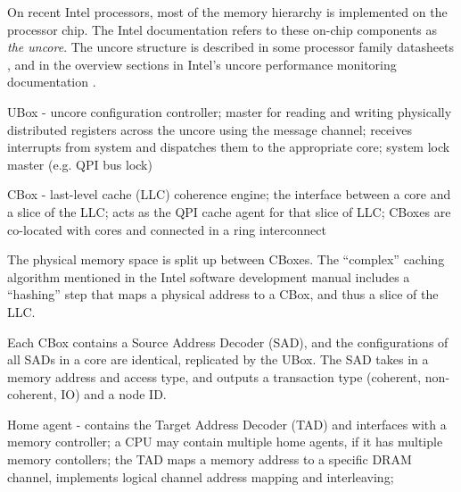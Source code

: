 On recent Intel processors, most of the memory hierarchy is implemented on the
processor chip. The Intel documentation refers to these on-chip components as
\textit{the uncore}. The uncore structure is described in some processor
family datasheets \cite{intel2014datasheet,intel2010datasheet}, and in the
overview sections in Intel's uncore performance monitoring documentation
\cite{intel2014uncore, intel2012uncore, intel2010uncore}.

UBox - uncore configuration controller; master for reading and writing
physically distributed registers across the uncore using the message
channel; receives interrupts from system and dispatches them to the
appropriate core; system lock master (e.g. QPI bus lock)

CBox - last-level cache (LLC) coherence engine; the interface between a core
and a slice of the LLC; acts as the QPI cache agent for that slice of LLC;
CBoxes are co-located with cores and connected in a ring interconnect

The physical memory space is split up between CBoxes. The ``complex'' caching
algorithm mentioned in the Intel software development manual
\cite{intel2014manual} includes a ``hashing'' step that maps a physical address
to a CBox, and thus a slice of the LLC.

Each CBox contains a Source Address Decoder (SAD), and the configurations of
all SADs in a core are identical, replicated by the UBox. The SAD takes in a
memory address and access type, and outputs a transaction type (coherent,
non-coherent, IO) and a node ID.

Home agent - contains the Target Address Decoder (TAD) and interfaces with a
memory controller; a CPU may contain multiple home agents, if it has multiple
memory contollers; the TAD maps a memory address to a specific DRAM channel,
implements logical channel address mapping and interleaving;

